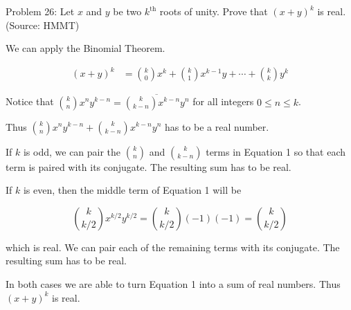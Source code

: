 Problem 26: Let $x$ and $y$ be two $k^{\text{th}}$ roots of unity. Prove that $(x + y)^k$ is real. (Source: HMMT)

We can apply the Binomial Theorem.

\begin{align}
(x + y)^k &= \binom{k}{0} x^k + \binom{k}{1} x^{k-1}y + \cdots + \binom{k}{k} y^k
\end{align}

Notice that $\displaystyle \binom{k}{n} x^{n} y^{k-n} = \overline{\binom{k}{k-n}  x^{k-n}y^n}$ for all integers $0 \leq n \leq k$.

Thus $\displaystyle \binom{k}{n} x^{n} y^{k-n} + \binom{k}{k-n} x^{k-n}y^n$ has to be a real number.

If $k$ is odd, we can pair the $\displaystyle \binom{k}{n}$ and $\displaystyle \binom{k}{k-n}$ terms in Equation 1 so that each term is paired with its conjugate. The resulting sum has to be real.

If $k$ is even, then the middle term of Equation 1 will be

$$ \binom{k}{k/2} x^{k/2}y^{k/2} = \binom{k}{k/2} (-1) (-1) = \binom{k}{k/2}$$

which is real. We can pair each of the remaining terms with its conjugate. The resulting sum has to be real.

In both cases we are able to turn Equation 1 into a sum of real numbers. Thus $(x + y)^k$ is real.
